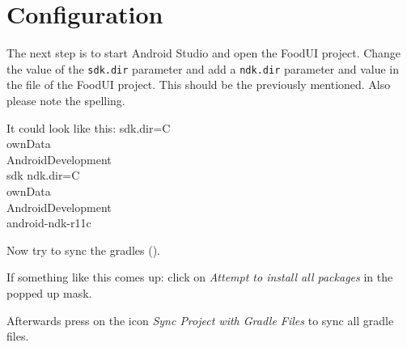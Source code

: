 \documentclass[abstract=on, 12pt, a4paper]{scrartcl}
\begin{document}
\section{Configuration}
The next step is to start Android Studio and open the FoodUI project.
Change the value of the \texttt{sdk.dir} parameter and add a \texttt{ndk.dir} parameter and value in the file  of the FoodUI project. This should be the previously mentioned. Also please note the spelling.

It could look like this:
sdk.dir=C\:\\ownData\\AndroidDevelopment\\sdk
ndk.dir=C\:\\ownData\\AndroidDevelopment\\android-ndk-r11c

Now try to sync the gradles ().

If something like this comes up:
click on \textit{Attempt to install all packages} in the popped up mask.

Afterwards press on the icon \textit{Sync Project with Gradle Files} to sync all gradle files.
\end{document}
